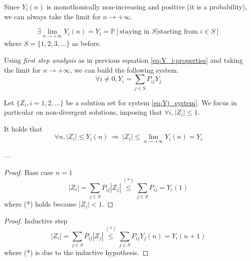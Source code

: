 	\begin{lemma}
		Since $Y_i(n)$ is monothonically non-increasing and positive (it is a probability), we can always take the limit for $n \to +\infty$.

		$$ \exists \lim_{n \to +\infty} Y_i(n) \stackrel{.}{=} Y_i = \mathbb{P}[\text{staying in } S | \text{starting from } i \in S] $$
		where $ S = \{ 1, 2, 3, ...\} $ as before.

		Using \emph{first step analysis} as in previous equation \ref{eq:Y_i-properties} and taking the limit for $n \to +\infty $, we can build the following system.
		\begin{equation} \label{eq:Yj_system}
			\forall i \neq 0, Y_i = \sum_{j \in S} P_{ij} Y_j
		\end{equation}
	\end{lemma}

	\begin{lemma}
		Let $\{Z_i, i=1, 2, ...\}$ be a solution set for system \ref{eq:Yj_system}. We focus in particular on non-divergent solutions, imposing that $ \forall i, |Z_i| \le 1 $.

		It holds that
		$$ \forall n, |Z_i| \le Y_i(n) ~ \Rightarrow ~|Z_i| \le \lim_{n \to +\infty} Y_i(n) = Y_i $$
	\end{lemma}
	---
	\begin{proof} Base case $n=1$
		$$ |Z_i| = \sum_{j \in S} P_{ij} |Z_j| \stackrel{(*)}{\le} \sum_{j \in S} P_{ij} = Y_i(1) $$
		where (*) holds because $|Z_i| < 1$.
	\end{proof}

	\begin{proof} Inductive step
		$$ |Z_i| = \sum_{j \in S} P_{ij} |Z_j| \stackrel{(*)}{\le} \sum_{j \in S} P_{ij} Y_j(n) = Y_i(n+1) $$
		where (*) is due to the inductive hypothesis.
	\end{proof}

